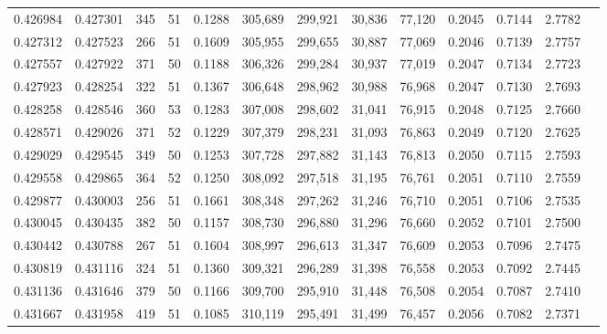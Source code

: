 \begin{tabular}{rrrrrrrrrrrrr}
0.426984 & 0.427301 &    345 &    51 &                                     0.1288 & 305,689 & 299,921 &  30,836 &  77,120 & 0.2045 & 0.7144 & 2.7782 \\
0.427312 & 0.427523 &    266 &    51 &                                     0.1609 & 305,955 & 299,655 &  30,887 &  77,069 & 0.2046 & 0.7139 & 2.7757 \\
0.427557 & 0.427922 &    371 &    50 &                                     0.1188 & 306,326 & 299,284 &  30,937 &  77,019 & 0.2047 & 0.7134 & 2.7723 \\
0.427923 & 0.428254 &    322 &    51 &                                     0.1367 & 306,648 & 298,962 &  30,988 &  76,968 & 0.2047 & 0.7130 & 2.7693 \\
0.428258 & 0.428546 &    360 &    53 &                                     0.1283 & 307,008 & 298,602 &  31,041 &  76,915 & 0.2048 & 0.7125 & 2.7660 \\
0.428571 & 0.429026 &    371 &    52 &                                     0.1229 & 307,379 & 298,231 &  31,093 &  76,863 & 0.2049 & 0.7120 & 2.7625 \\
0.429029 & 0.429545 &    349 &    50 &                                     0.1253 & 307,728 & 297,882 &  31,143 &  76,813 & 0.2050 & 0.7115 & 2.7593 \\
0.429558 & 0.429865 &    364 &    52 &                                     0.1250 & 308,092 & 297,518 &  31,195 &  76,761 & 0.2051 & 0.7110 & 2.7559 \\
0.429877 & 0.430003 &    256 &    51 &                                     0.1661 & 308,348 & 297,262 &  31,246 &  76,710 & 0.2051 & 0.7106 & 2.7535 \\
0.430045 & 0.430435 &    382 &    50 &                                     0.1157 & 308,730 & 296,880 &  31,296 &  76,660 & 0.2052 & 0.7101 & 2.7500 \\
0.430442 & 0.430788 &    267 &    51 &                                     0.1604 & 308,997 & 296,613 &  31,347 &  76,609 & 0.2053 & 0.7096 & 2.7475 \\
0.430819 & 0.431116 &    324 &    51 &                                     0.1360 & 309,321 & 296,289 &  31,398 &  76,558 & 0.2053 & 0.7092 & 2.7445 \\
0.431136 & 0.431646 &    379 &    50 &                                     0.1166 & 309,700 & 295,910 &  31,448 &  76,508 & 0.2054 & 0.7087 & 2.7410 \\
0.431667 & 0.431958 &    419 &    51 &                                     0.1085 & 310,119 & 295,491 &  31,499 &  76,457 & 0.2056 & 0.7082 & 2.7371 \\

\end{tabular}
